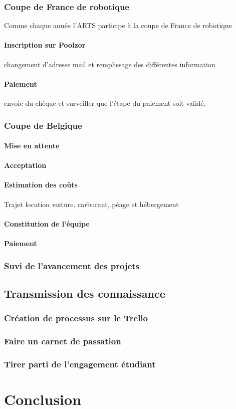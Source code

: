 \documentclass[12pt,a4paper]{report}
\begin{document}
    \subsection{Coupe de France de robotique}
      Comme chaque année l'ARTS participe à la coupe de France de robotique
      \subsubsection{Inscription sur Poolzor}
        changement d'adresse mail
        et remplissage des différentes information
      \subsubsection{Paiement}
        envoie du chèque et surveiller que l'étape du paiement soit validé.
    \subsection{Coupe de Belgique}
      \subsubsection{Mise en attente}
      \subsubsection{Acceptation}
      \subsubsection{Estimation des coûts}
        Trajet location voiture, carburant, péage et hébergement
      \subsubsection{Constitution de l'équipe}
      \subsubsection{Paiement}
    \subsection{Suvi de l'avancement des projets}

  \section{Transmission des connaissance}
    \subsection{Création de processus sur le Trello}
    \subsection{Faire un carnet de passation}
    \subsection{Tirer parti de l'engagement étudiant}

\chapter*{Conclusion}
\end{document}
